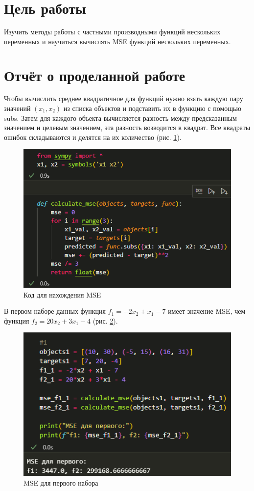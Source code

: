 \documentclass[14pt,a4paper]{extarticle}
\begin{document}


\section*{Цель работы}
        Изучить методы работы с частными производными
функций нескольких переменных и научиться вычислять 
MSE функций нескольких переменных.


\section*{Отчёт о проделанной работе}
Чтобы вычислить среднее квадратичное для функций нужно взять каждую пару значений $(x_1,x_2)$
из списка объектов и подставить их в функцию с помощью subs. Затем для каждого объекта вычисляется
разность между предсказанным значением и целевым значением, эта разность возводится в квадрат.
Все квадраты ошибок складываются и делятся на их количество (рис. \ref{pic:cod}).

\begin{figure}[ht!]
    \centering
    \includegraphics[width=0.7\linewidth]{figures/1.png}
    \caption{Код для нахождения MSE}
    \label{pic:cod}
\end{figure}

В первом наборе данных функция
$f_1=-2x_2+x_1-7$ имеет значение MSE, чем функция $f_2=20x_2+3x_1-4$ (рис. \ref{pic:mse1}).

\begin{figure}[ht!]
    \centering
    \includegraphics[width=0.9\linewidth]{figures/1.1.png}
    \caption{MSE для первого набора}
    \label{pic:mse1}
\end{figure}
\end{document}
